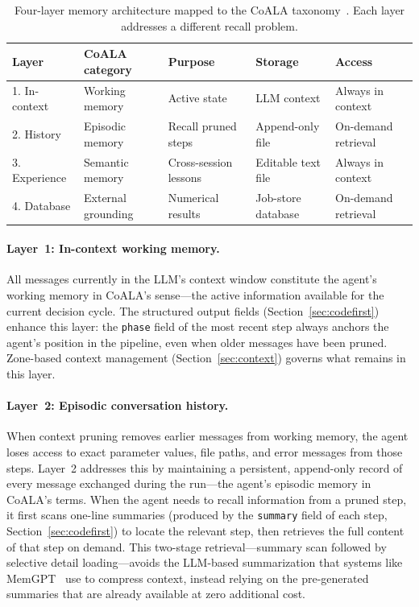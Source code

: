 \documentclass{article}
\begin{document}
\begin{table}[t]
  \caption{Four-layer memory architecture mapped to the CoALA taxonomy~\citep{Sumers2024coala}. Each layer addresses a different recall problem.}
  \label{tbl:memory}
  \centering
  \small
  \begin{tabular}{lllll}
    \toprule
    Layer & CoALA category & Purpose & Storage & Access \\
    \midrule
    1. In-context & Working memory & Active state & LLM context & Always in context \\
    2. History & Episodic memory & Recall pruned steps & Append-only file & On-demand retrieval \\
    3. Experience & Semantic memory & Cross-session lessons & Editable text file & Always in context \\
    4. Database & External grounding & Numerical results & Job-store database & On-demand retrieval \\
    \bottomrule
  \end{tabular}
\end{table}

\paragraph{Layer~1: In-context working memory.}
All messages currently in the LLM's context window constitute the agent's working memory in CoALA's sense---the active information available for the current decision cycle.
The structured output fields (Section~\ref{sec:codefirst}) enhance this layer: the \texttt{phase} field of the most recent step always anchors the agent's position in the pipeline, even when older messages have been pruned.
Zone-based context management (Section~\ref{sec:context}) governs what remains in this layer.

\paragraph{Layer~2: Episodic conversation history.}
When context pruning removes earlier messages from working memory, the agent loses access to exact parameter values, file paths, and error messages from those steps.
Layer~2 addresses this by maintaining a persistent, append-only record of every message exchanged during the run---the agent's episodic memory in CoALA's terms.
When the agent needs to recall information from a pruned step, it first scans one-line summaries (produced by the \texttt{summary} field of each step, Section~\ref{sec:codefirst}) to locate the relevant step, then retrieves the full content of that step on demand.
This two-stage retrieval---summary scan followed by selective detail loading---avoids the LLM-based summarization that systems like MemGPT~\citep{Packer2024memgpt} use to compress context, instead relying on the pre-generated summaries that are already available at zero additional cost.
\end{document}
